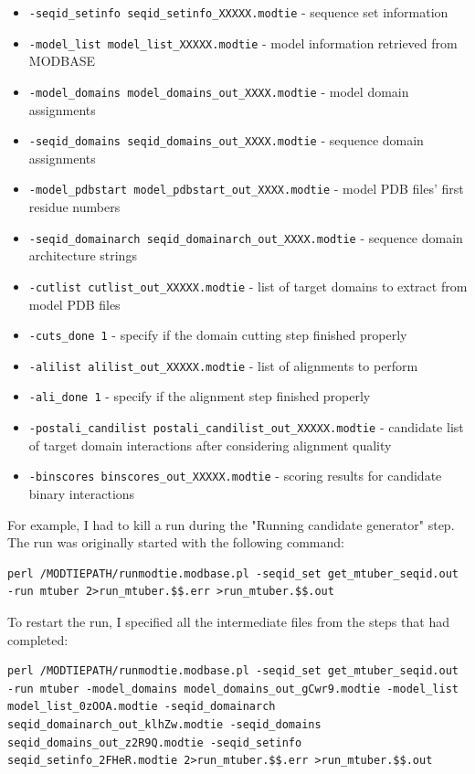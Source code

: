 \documentclass[11pt]{article}
\begin{document}
\begin{itemize}
   \item {\tt -seqid\_setinfo seqid\_setinfo\_XXXXX.modtie} - sequence set information
   \item {\tt -model\_list model\_list\_XXXXX.modtie} - model information retrieved from MODBASE
   \item {\tt -model\_domains model\_domains\_out\_XXXX.modtie} - model domain assignments
   \item {\tt -seqid\_domains seqid\_domains\_out\_XXXX.modtie} - sequence domain assignments
   \item {\tt -model\_pdbstart model\_pdbstart\_out\_XXXX.modtie} - model PDB files' first residue numbers
   \item {\tt -seqid\_domainarch seqid\_domainarch\_out\_XXXX.modtie} - sequence domain architecture strings
   \item {\tt -cutlist cutlist\_out\_XXXXX.modtie} - list of target domains to extract from model PDB files
   \item {\tt -cuts\_done 1} - specify if the domain cutting step finished properly
   \item {\tt -alilist alilist\_out\_XXXXX.modtie} - list of alignments to perform
   \item {\tt -ali\_done 1} - specify if the alignment step finished properly
   \item {\tt -postali\_candilist postali\_candilist\_out\_XXXXX.modtie} - candidate list of target domain interactions after considering alignment quality
   \item {\tt -binscores binscores\_out\_XXXXX.modtie} - scoring results for candidate binary interactions
\end{itemize}

For example, I had to kill a run during the "Running candidate generator" step. The run was originally started with the following command:
\lstset{breaklines=true,language=bash,breakatwhitespace=true}
\lstset{frame=single}
\lstset{basicstyle=\ttfamily}
\begin{lstlisting}
perl /MODTIEPATH/runmodtie.modbase.pl -seqid_set get_mtuber_seqid.out -run mtuber 2>run_mtuber.$$.err >run_mtuber.$$.out
\end{lstlisting}

To restart the run, I specified all the intermediate files from the steps that had completed:
\lstset{breaklines=true,language=bash,breakatwhitespace=true}
\lstset{frame=single}
\lstset{basicstyle=\ttfamily}
\begin{lstlisting}
perl /MODTIEPATH/runmodtie.modbase.pl -seqid_set get_mtuber_seqid.out -run mtuber -model_domains model_domains_out_gCwr9.modtie -model_list model_list_0zOOA.modtie -seqid_domainarch seqid_domainarch_out_klhZw.modtie -seqid_domains seqid_domains_out_z2R9Q.modtie -seqid_setinfo seqid_setinfo_2FHeR.modtie 2>run_mtuber.$$.err >run_mtuber.$$.out
\end{lstlisting}
\end{document}
